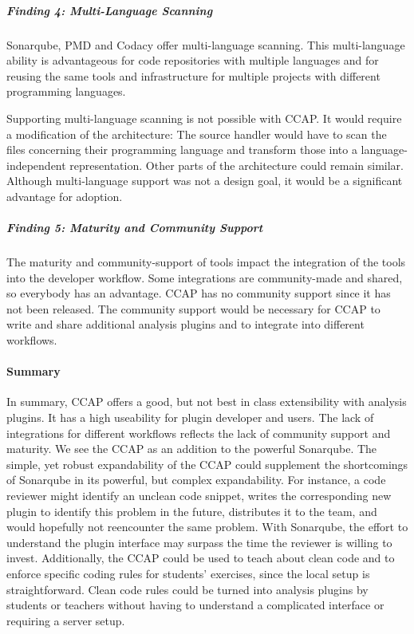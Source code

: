 \subparagraph{Finding 4: Multi-Language Scanning}
Sonarqube, PMD and Codacy offer multi-language scanning. This multi-language ability is advantageous for code repositories with multiple languages and for reusing the same tools and infrastructure for multiple projects with different programming languages. 

Supporting multi-language scanning is not possible with CCAP. It would require a modification of the architecture: The source handler would have to scan the files concerning their programming language and transform those into a language-independent representation. Other parts of the architecture could remain similar. Although multi-language support was not a design goal, it would be a significant advantage for adoption.

\subparagraph{Finding 5: Maturity and Community Support}
The maturity and community-support of tools impact the integration of the tools into the developer workflow. Some integrations are community-made and shared, so everybody has an advantage. 
CCAP has no community support since it has not been released. The community support would be necessary for CCAP to write and share additional analysis plugins and to integrate into different workflows. 

\paragraph{Summary}
In summary, CCAP offers a good, but not best in class extensibility with analysis plugins. It has a high useability for plugin developer and users. The lack of integrations for different workflows reflects the lack of community support and maturity. 
We see the CCAP as an addition to the powerful Sonarqube. The simple, yet robust expandability of the CCAP could supplement the shortcomings of Sonarqube in its powerful, but complex expandability. For instance, a code reviewer might identify an unclean code snippet, writes the corresponding new plugin to identify this problem in the future, distributes it to the team, and would hopefully not reencounter the same problem. With Sonarqube, the effort to understand the plugin interface may surpass the time the reviewer is willing to invest.
Additionally, the CCAP could be used to teach about clean code and to enforce specific coding rules for students' exercises, since the local setup is straightforward. Clean code rules could be turned into analysis plugins by students or teachers without having to understand a complicated interface or requiring a server setup.


